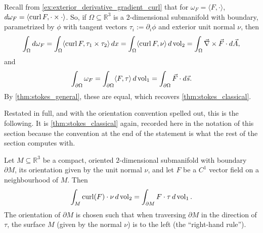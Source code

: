 Recall from \cref{ex:exterior_derivative_gradient_curl} that for $\omega_F =
\langle F,\cdot\rangle$, $d\omega_F = \langle\operatorname{curl} F,\cdot\times\cdot\rangle$. So, if $\Omega
\subseteq \mathbb{R}^3$ is a $2$-dimensional submanifold with boundary, parametrized by $\phi$
with tangent vectors $\tau_i := \partial_i\phi$ and exterior unit normal $\nu$, then
\[
\int_\Omega d\omega_F = \int_\Omega \langle\operatorname{curl} F,\tau_1\times\tau_2\rangle\,dx
  = \int_\Omega \langle\operatorname{curl} F,\nu\rangle\,d\operatorname{vol}_2 = \int_\Omega \vec\nabla\times\vec F\cdot
  d\vec A,
\]
and
\[\int_{\partial\Omega} \omega_F = \int_{\partial\Omega} \langle F,\tau\rangle\,d\operatorname{vol}_1
  = \int_{\partial\Omega} \vec F\cdot d\vec s.\]
By \cref{thm:stokes_general}, these are equal, which recovers \cref{thm:stokes_classical}.

Restated in full, and with the orientation convention spelled out, this is the following. It is
\cref{thm:stokes_classical} again, recorded here in the notation of this section because the
convention at the end of the statement is what the rest of the section computes with.

\begin{theorem}
\label{thm:stokes_3d}
Let $M \subseteq \mathbb{R}^3$ be a compact, oriented $2$-dimensional submanifold with boundary
$\partial M$, its orientation given by the unit normal $\nu$, and let $F$ be a $C^1$ vector field
on a neighbourhood of $M$. Then
\[\int_M \operatorname{curl}(F) \cdot \nu \,d\operatorname{vol}_2 = \int_{\partial M} F \cdot \tau \,d\operatorname{vol}_1.\]
The orientation of $\partial M$ is chosen such that when traversing $\partial M$ in the direction of $\tau$, the surface $M$ (given by the normal $\nu$) is to the left (the ``right-hand rule'').
\end{theorem}

